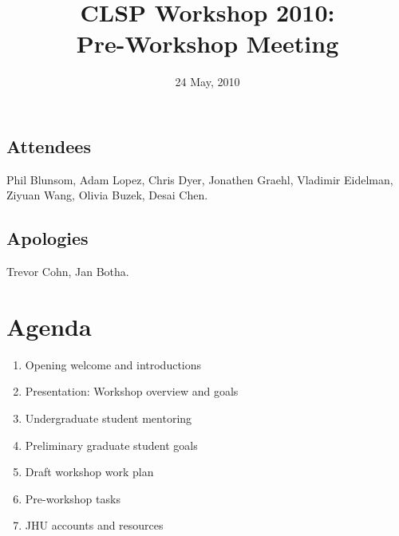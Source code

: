 \documentclass[12pt]{article}
\title{CLSP Workshop 2010: \\ Pre-Workshop Meeting}
\date{24 May, 2010}
\begin{document}
\maketitle

\centering
\subsection*{Attendees}
Phil Blunsom, Adam Lopez, Chris Dyer, Jonathen Graehl, Vladimir Eidelman, Ziyuan Wang, Olivia Buzek, Desai Chen.

\subsection*{Apologies}
Trevor Cohn, Jan Botha.

\section*{Agenda}
\begin{enumerate}
\centering
\item Opening welcome and introductions 
\item Presentation: Workshop overview and goals
\item Undergraduate student mentoring
\item Preliminary graduate student goals
\item Draft workshop work plan
\item Pre-workshop tasks
\item JHU accounts and resources 
\end{enumerate}
\end{document}
